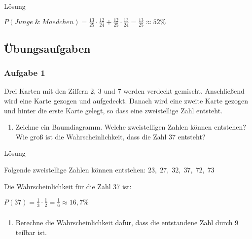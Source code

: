 \documentclass[
  ngerman,
]{book}
\providecommand{\tightlist}{%
  \setlength{\itemsep}{0pt}\setlength{\parskip}{0pt}}
\begin{document}
Lösung

\(P(Junge\;\&\;Maedchen) = \frac{13}{25} \cdot \frac{12}{24} + \frac{12}{25} \cdot \frac{13}{24} = \frac{13}{25} \approx 52\%\)

\hypertarget{section-141}{%
\subsubsection*{}\label{section-141}}

\hypertarget{uxfcbungsaufgaben}{%
\subsection*{Übungsaufgaben}\label{uxfcbungsaufgaben}}

\hypertarget{aufgabe-1-15}{%
\subsubsection*{Aufgabe 1}\label{aufgabe-1-15}}

Drei Karten mit den Ziffern 2, 3 und 7 werden verdeckt gemischt. Anschließend wird eine Karte gezogen und aufgedeckt. Danach wird eine zweite Karte gezogen und hinter die erste Karte gelegt, so dass eine zweistellige Zahl entsteht.

\begin{enumerate}
\def\labelenumi{\alph{enumi})}
\tightlist
\item
  Zeichne ein Baumdiagramm. Welche zweistelligen Zahlen können entstehen? Wie groß ist die Wahrscheinlichkeit, dass die Zahl 37 entsteht?
\end{enumerate}

Lösung

Folgende zweistellige Zahlen können entstehen: \(23,\;27,\;32,\;37,\;72,\;73\)

Die Wahrscheinlichkeit für die Zahl 37 ist:

\(P(37) = \frac{1}{3}\cdot\frac{1}{2}=\frac{1}{6} \approx 16,7\%\)

\hypertarget{section-142}{%
\subsubsection*{}\label{section-142}}

\begin{enumerate}
\def\labelenumi{\alph{enumi})}
\setcounter{enumi}{1}
\tightlist
\item
  Berechne die Wahrscheinlichkeit dafür, dass die entstandene Zahl durch 9 teilbar ist.
\end{enumerate}
\end{document}
